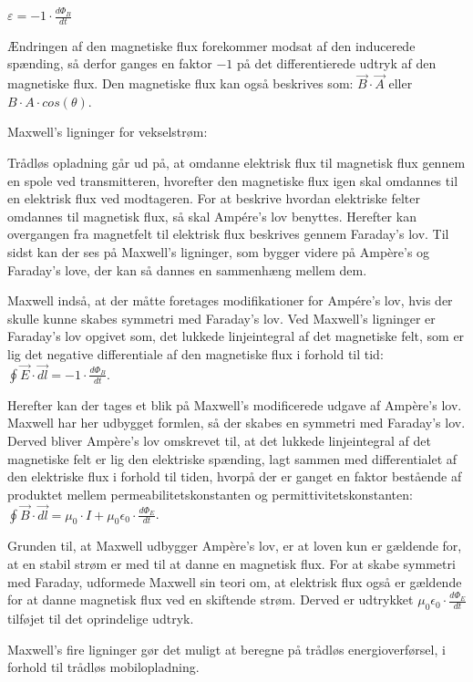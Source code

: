 \centerline{$\varepsilon = -1 \cdot \frac{d \Phi_B}{dt}$}

Ændringen af den magnetiske flux forekommer modsat af den inducerede spænding, så derfor ganges en faktor $-1$ på det differentierede udtryk af den magnetiske flux. Den magnetiske flux kan også beskrives som: $\vec{B} \cdot \vec{A}$ eller $B \cdot A \cdot cos(\theta)$.

Maxwell's ligninger for vekselstrøm:

Trådløs opladning går ud på, at omdanne elektrisk flux til magnetisk flux gennem en spole ved transmitteren, hvorefter den magnetiske flux igen skal omdannes til en elektrisk flux ved modtageren. For at beskrive hvordan elektriske felter omdannes til magnetisk flux, så skal Ampére's lov benyttes. Herefter kan overgangen fra magnetfelt til elektrisk flux beskrives gennem Faraday's lov. Til sidst kan der ses på Maxwell's ligninger, som bygger videre på Ampère's og Faraday's love, der kan så dannes en sammenhæng mellem dem.

Maxwell indså, at der måtte foretages modifikationer for Ampére's lov, hvis der skulle kunne skabes symmetri med Faraday's lov. Ved Maxwell's ligninger er Faraday's lov opgivet som, det lukkede linjeintegral af det magnetiske felt, som er lig det negative differentiale af den magnetiske flux i forhold til tid: $\oint \vec{E} \cdot \vec{dl} = -1 \cdot \frac{d \Phi_B}{dt}$.

Herefter kan der tages et blik på Maxwell's modificerede udgave af Ampère's lov. Maxwell har her udbygget formlen, så der skabes en symmetri med Faraday's lov. Derved bliver Ampère's lov omskrevet til, at det lukkede linjeintegral af det magnetiske felt er lig den elektriske spænding, lagt sammen med differentialet af den elektriske flux i forhold til tiden, hvorpå der er ganget en faktor bestående af produktet mellem permeabilitetskonstanten og permittivitetskonstanten: $\oint \vec{B} \cdot \vec{dl} = \mu_0 \cdot I + \mu_0 \epsilon_0 \cdot \frac{d \Phi_E}{dt}$.

Grunden til, at Maxwell udbygger Ampère's lov, er at loven kun er gældende for, at en stabil strøm er med til at danne en magnetisk flux. For at skabe symmetri med Faraday, udformede Maxwell sin teori om, at elektrisk flux også er gældende for at danne magnetisk flux ved en skiftende strøm. Derved er udtrykket $\mu_0 \epsilon_0 \cdot \frac{d \Phi_E}{dt}$ tilføjet til det oprindelige udtryk.

Maxwell's fire ligninger gør det muligt at beregne på trådløs energioverførsel, i forhold til trådløs mobilopladning.

\newpage